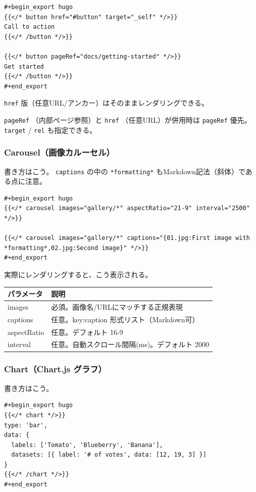 \documentclass[11pt]{article}
\begin{document}
\begin{verbatim}
#+begin_export hugo
{{</* button href="#button" target="_self" */>}}
Call to action
{{</* /button */>}}

{{</* button pageRef="docs/getting-started" */>}}
Get started
{{</* /button */>}}
#+end_export
\end{verbatim}

\texttt{href} 版（任意URL/アンカー）はそのままレンダリングできる。

\texttt{pageRef} （内部ページ参照）と \texttt{href} （任意URL）が併用時は \texttt{pageRef} 優先。 \texttt{target} / \texttt{rel} も指定できる。
\subsubsection{Carousel（画像カルーセル）}
\label{sec:org138f9a4}

書き方はこう。 \texttt{captions} の中の \texttt{*formatting*} もMarkdown記法（斜体）である点に注意。

\begin{verbatim}
#+begin_export hugo
{{</* carousel images="gallery/*" aspectRatio="21-9" interval="2500" */>}}

{{</* carousel images="gallery/*" captions="{01.jpg:First image with *formatting*,02.jpg:Second image}" */>}}
#+end_export
\end{verbatim}

実際にレンダリングすると、こう表示される。

\begin{center}
\begin{tabular}{ll}
パラメータ & 説明\\
\hline
images & 必須。画像名/URLにマッチする正規表現\\
captions & 任意。key:caption 形式リスト（Markdown可）\\
aspectRatio & 任意。デフォルト 16-9\\
interval & 任意。自動スクロール間隔(ms)。デフォルト 2000\\
\end{tabular}
\end{center}
\subsubsection{Chart（Chart.js グラフ）}
\label{sec:orgcd7eb59}

書き方はこう。

\begin{verbatim}
#+begin_export hugo
{{</* chart */>}}
type: 'bar',
data: {
  labels: ['Tomato', 'Blueberry', 'Banana'],
  datasets: [{ label: '# of votes', data: [12, 19, 3] }]
}
{{</* /chart */>}}
#+end_export
\end{verbatim}
\end{document}

